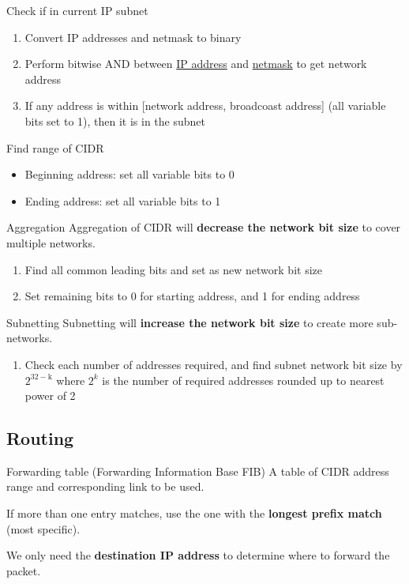 \begin{theorem}
    {Check if in current IP subnet}
    \begin{enumerate}
        \item Convert IP addresses and netmask to binary
        \item Perform bitwise AND between \underline{IP address} and \underline{netmask} to get network address
        \item If any address is within [network address, broadcoast address] (all variable bits set to 1), then it is in the subnet
    \end{enumerate}
\end{theorem}
\begin{theorem}
    {Find range of CIDR}
    \begin{itemize}
        \item Beginning address: set all variable bits to 0
        \item Ending address: set all variable bits to 1
    \end{itemize}
\end{theorem}
\begin{theorem}
    {Aggregation}
    Aggregation of CIDR will \textbf{decrease the network bit size} to cover multiple networks.
    \begin{enumerate}
        \item Find all common leading bits and set as new network bit size
        \item Set remaining bits to 0 for starting address, and 1 for ending address
    \end{enumerate}
\end{theorem}
\begin{theorem}
    {Subnetting}
    Subnetting will \textbf{increase the network bit size} to create more sub-networks.
    \begin{enumerate}
        \item Check each number of addresses required, and find subnet network bit size by $2^{32-\text{k}}$ where $2^k$ is the number of required addresses rounded up to nearest power of 2
    \end{enumerate}
\end{theorem}

\subsection{Routing}

\begin{definition}
    {Forwarding table (Forwarding Information Base FIB)}
    A table of CIDR address range and corresponding link to be used.

    If more than one entry matches, use the one with the \textbf{longest prefix match} (most specific).

    We only need the \textbf{destination IP address} to determine where to forward the packet.
\end{definition}

